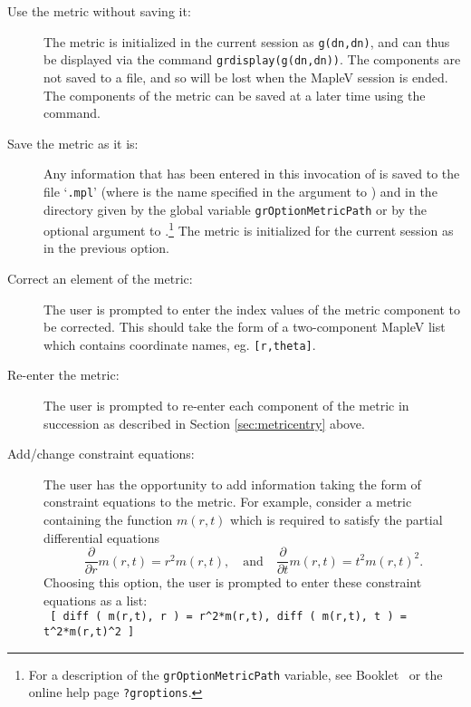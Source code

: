 \documentclass{article}
\begin{document}
\begin{description}
  \item[Use the metric without saving it:]
    The metric is initialized in the current session as \texttt{g(dn,dn)},
    and can thus be displayed via the command \texttt{grdisplay(g(dn,dn))}.
    The components are not saved to a file, and so will be lost when the
    MapleV session is ended. The components of the metric can be saved at
    a later time using the  command.
%
  \item[Save the metric as it is:]
    Any information that has been entered in this invocation of 
    is saved to the file `\texttt{.mpl}' 
    (where  is the name specified
    in the argument to ) and in the directory given by the global
    variable \texttt{grOptionMetricPath} or by the optional 
     argument to .\footnote{For a description
    of the \texttt{grOptionMetricPath} variable, see Booklet \grSetupRef~or
    the online help page \texttt{?groptions}.}
    The metric is initialized for the current session as in the previous
    option.
%
  \item[Correct an element of the metric:]
    The user is prompted to enter the index values of the metric component 
    to be corrected. This should take the form of a two-component MapleV list
    which contains coordinate names, eg. \texttt{[r,theta]}.
%
  \item[Re-enter the metric:]
    The user is prompted to re-enter each component of the metric in
    succession as described in Section \ref{sec:metricentry} above.
%
  \item[Add/change constraint equations:]
    The user has the opportunity to add information taking the form of
    constraint equations to the metric. For example, consider a
    metric containing the function $m(r,t)$ which is required to satisfy the 
    partial differential equations
    \[
      \frac{\partial}{\partial r}m(r,t) = r^2 m(r,t), \quad \text{and} \quad
      \frac{\partial}{\partial t}m(r,t) = t^2 m(r,t)^2.
    \]
    Choosing this option, the user is prompted to enter these constraint
    equations as a list:
    \vspace{\baselineskip}\\
      \texttt{
        [ diff ( m(r,t), r ) = r\^{}2*m(r,t), 
        diff ( m(r,t), t ) = t\^{}2*m(r,t)\^{}2 ]
      }
    \vspace{\baselineskip}\\

\end{description}
\end{document}
